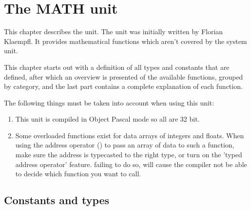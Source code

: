 %
%
%
%
%
\chapter{The MATH unit}

This chapter describes the  unit. The  unit
was initially written by Florian Klaempfl. It provides mathematical
functions which aren't covered by the system unit.

This chapter starts out with a definition of all types and constants
that are defined, after which an overview is presented of the available 
functions, grouped by category, and the last part contains a 
complete explanation of each function.

The following things must be taken into account when using this unit:
\begin{enumerate}
\item This unit is compiled in Object Pascal mode so all
 are 32 bit.
\item Some overloaded functions exist for data arrays of integers and
floats. When using the address operator () to pass an array of 
data to such a function, make sure the address is typecasted to the 
right type, or turn on the 'typed address operator' feature. failing to
do so, will cause the compiler not be able to decide which function you 
want to call.
\end{enumerate}

\section{Constants and types}

